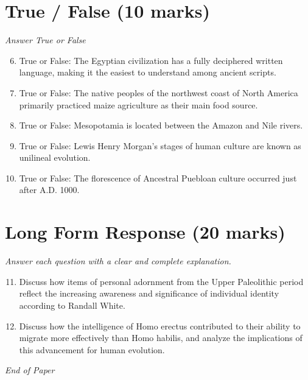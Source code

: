 \documentclass[12pt]{article}
\begin{document}
\section*{True / False (10 marks)}
\textit{Answer True or False}
\begin{enumerate}[label=\arabic*.]
\setcounter{enumi}{5}
\item True or False: The Egyptian civilization has a fully deciphered written language, making it the easiest to understand among ancient scripts.
\item True or False: The native peoples of the northwest coast of North America primarily practiced maize agriculture as their main food source.
\item True or False: Mesopotamia is located between the Amazon and Nile rivers.
\item True or False: Lewis Henry Morgan's stages of human culture are known as unilineal evolution.
\item True or False: The florescence of Ancestral Puebloan culture occurred just after A.D. 1000.
\end{enumerate}

\section*{Long Form Response (20 marks)}
\textit{Answer each question with a clear and complete explanation.}
\begin{enumerate}[label=\arabic*.]
\setcounter{enumi}{10}
\item Discuss how items of personal adornment from the Upper Paleolithic period reflect the increasing awareness and significance of individual identity according to Randall White.
\item Discuss how the intelligence of Homo erectus contributed to their ability to migrate more effectively than Homo habilis, and analyze the implications of this advancement for human evolution.
\end{enumerate}

\vfill
\noindent\textit{End of Paper}
\end{document}
